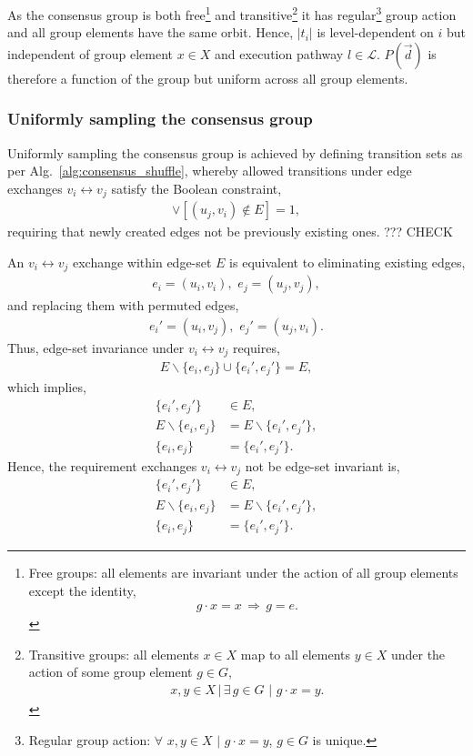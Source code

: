 As the consensus group is both free\footnote{Free groups: all elements are invariant under the action of all group elements except the identity,
	\begin{align}
		g\cdot x = x\, \Rightarrow\, g=e.\nonumber
	\end{align}} and transitive\footnote{Transitive groups: all elements $x\in X$ map to all elements $y\in X$ under the action of some group element $g\in G$,
	\begin{align}
		x,y\in X \,|\, \exists\, g\in G \,\,|\,\, g\cdot x=y.\nonumber
	\end{align}}
it has regular\footnote{Regular group action: $\forall\,\,x,y\in X \,\,|\,\, g\cdot x=y$, $g\in G$ is unique.} group action and all group elements have the same orbit. Hence, $|t_i|$ is level-dependent on $i$ but independent of group element $x\in X$ and execution pathway $l\in\mathcal{L}$. $P(\vec{d})$ is therefore a function of the group but uniform across all group elements.

\subsubsection{Uniformly sampling the consensus group}

Uniformly sampling the consensus group is achieved by defining transition sets as per Alg.~\ref{alg:consensus_shuffle}, whereby allowed transitions under edge exchanges \mbox{$v_i\leftrightarrow v_j$} satisfy the Boolean constraint,
\begin{align}
	[(u_i,v_j) \not\in E] \lor [(u_j,v_i)	\not\in E] = 1,
\end{align}
requiring that newly created edges not be previously existing ones. ??? CHECK

An \mbox{$v_i\leftrightarrow v_j$} exchange within edge-set $E$ is equivalent to eliminating existing edges,
\begin{align}
	e_i = (u_i,v_i),\,\, e_j = (u_j,v_j),
\end{align}
and replacing them with permuted edges,
\begin{align}
	e_i' = (u_i,v_j),\,\, e_j' = (u_j,v_i).
\end{align}
Thus, edge-set invariance under \mbox{$v_i\leftrightarrow v_j$} requires,
\begin{align}
	E \backslash \{e_i,e_j\} \cup \{e_i',e_j'\} = E,
\end{align}
which implies,
\begin{align}
	\{e_i',e_j'\}            & \in E,\nonumber                        \\
	E \backslash \{e_i,e_j\} & = E \backslash \{e_i',e_j'\},\nonumber \\
	\{e_i,e_j\}              & =\{e_i',e_j'\}.
\end{align}
Hence, the requirement exchanges \mbox{$v_i\leftrightarrow v_j$} not be edge-set invariant is,
\begin{align}
	\{e_i',e_j'\}            & \in E,\nonumber                        \\
	E \backslash \{e_i,e_j\} & = E \backslash \{e_i',e_j'\},\nonumber \\
	\{e_i,e_j\}              & =\{e_i',e_j'\}.
\end{align}

